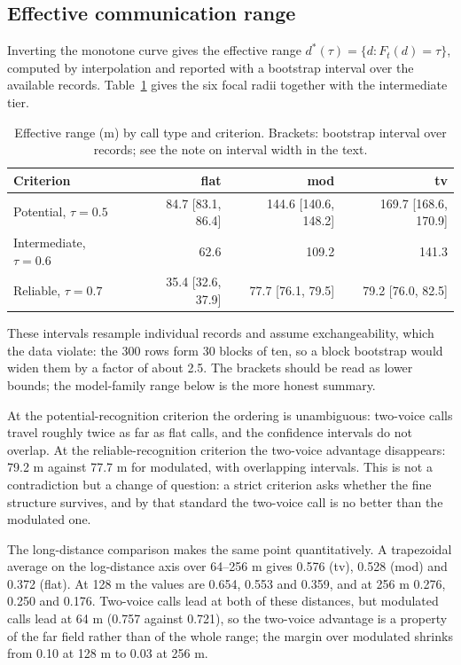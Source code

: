 \subsection{Effective communication range}

Inverting the monotone curve gives the effective range $d^*(\tau)=\{d: F_t(d)=\tau\}$, computed by
interpolation and reported with a bootstrap interval over the available records.
Table~\ref{tab:q2-ranges} gives the six focal radii together with the intermediate tier.

\begin{table}[htbp]
  \centering
  \caption{Effective range (m) by call type and criterion. Brackets: bootstrap interval over
  records; see the note on interval width in the text.}\label{tab:q2-ranges}
  \small
  \begin{tabular}{lrrr}
    \toprule
    Criterion & flat & mod & tv \\
    \midrule
    Potential, $\tau=0.5$ & 84.7 [83.1, 86.4] & 144.6 [140.6, 148.2] & 169.7 [168.6, 170.9] \\
    Intermediate, $\tau=0.6$ & 62.6 & 109.2 & 141.3 \\
    Reliable, $\tau=0.7$ & 35.4 [32.6, 37.9] & 77.7 [76.1, 79.5] & 79.2 [76.0, 82.5] \\
    \bottomrule
  \end{tabular}
\end{table}

These intervals resample individual records and assume exchangeability, which the data violate:
the 300 rows form 30 blocks of ten, so a block bootstrap would widen them by a factor of about
2.5. The brackets should be read as lower bounds; the model-family range below is the more
honest summary.

At the potential-recognition criterion the ordering is unambiguous: two-voice calls travel
roughly twice as far as flat calls, and the confidence intervals do not overlap. At the
reliable-recognition criterion the two-voice advantage disappears: 79.2 m against 77.7 m for
modulated, with overlapping intervals. This is not a contradiction but a change of question:
a strict criterion asks whether the fine structure survives, and by that standard the two-voice
call is no better than the modulated one.

The long-distance comparison makes the same point quantitatively. A trapezoidal average on the
log-distance axis over 64--256 m gives 0.576 (tv), 0.528 (mod) and 0.372 (flat). At 128 m the
values are 0.654, 0.553 and 0.359, and at 256 m 0.276, 0.250 and 0.176. Two-voice calls lead at
both of these distances, but modulated calls lead at 64 m (0.757 against 0.721), so the
two-voice advantage is a property of the far field rather than of the whole range; the margin
over modulated shrinks from 0.10 at 128 m to 0.03 at 256 m.

